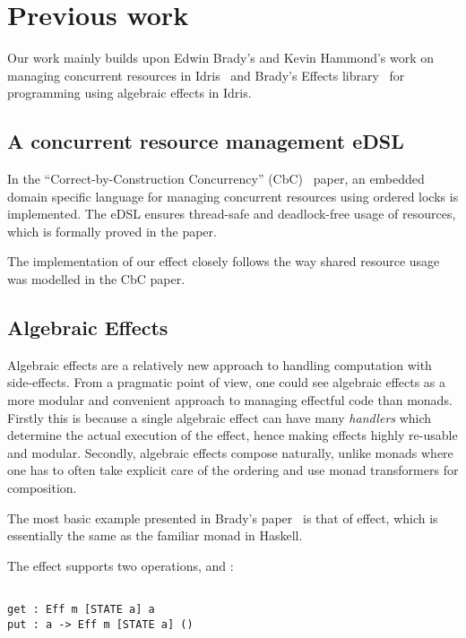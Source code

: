 \section{Previous work}

Our work mainly builds upon Edwin Brady's and Kevin Hammond's work on managing
concurrent resources in Idris~\cite{cbconc-fi} and Brady's Effects
library~\cite{effects-idr} for programming using algebraic effects in Idris.

\subsection{A concurrent resource management eDSL}

In the ``Correct-by-Construction Concurrency'' (CbC)~\cite{cbconc-fi} paper, an
embedded domain specific language for managing concurrent resources using
ordered locks is implemented. The eDSL ensures thread-safe and deadlock-free
usage of resources, which is formally proved in the paper.

The implementation of our effect closely follows the way shared resource usage
was modelled in the CbC paper.

\subsection{Algebraic Effects}

Algebraic effects are a relatively new approach to handling computation with
side-effects. From a pragmatic point of view, one could see algebraic effects
as a more modular and convenient approach to managing effectful code than
monads. Firstly this is because a single algebraic effect can have many
\emph{handlers} which determine the actual execution of the effect, hence
making effects highly re-usable and modular. Secondly, algebraic effects
compose naturally, unlike monads where one has to often take explicit care of
the ordering and use monad transformers for composition.

The most basic example presented in Brady's paper~\cite{effects-idr}
is that of  effect, which is essentially the same as the familiar
 monad in Haskell.

The  effect supports two operations,  and :

\begin{BVerbatim}

get : Eff m [STATE a] a
put : a -> Eff m [STATE a] ()

\end{BVerbatim}

